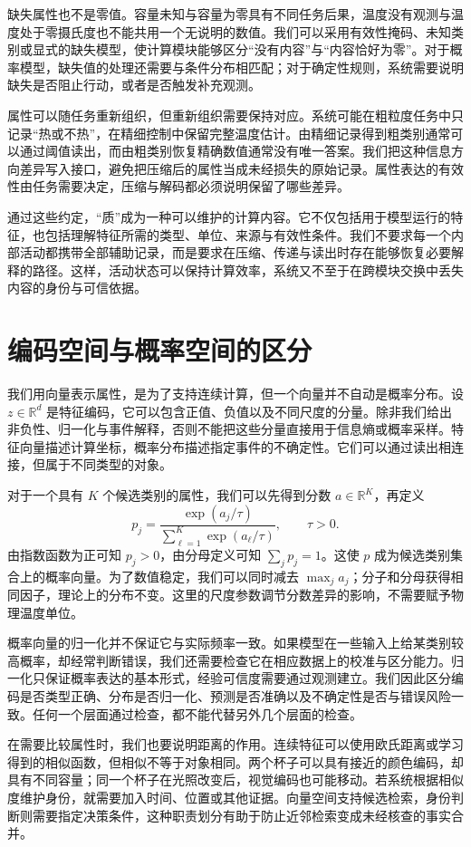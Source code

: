缺失属性也不是零值。容量未知与容量为零具有不同任务后果，温度没有观测与温度处于零摄氏度也不能共用一个无说明的数值。我们可以采用有效性掩码、未知类别或显式的缺失模型，使计算模块能够区分“没有内容”与“内容恰好为零”。对于概率模型，缺失值的处理还需要与条件分布相匹配；对于确定性规则，系统需要说明缺失是否阻止行动，或者是否触发补充观测。

属性可以随任务重新组织，但重新组织需要保持对应。系统可能在粗粒度任务中只记录“热或不热”，在精细控制中保留完整温度估计。由精细记录得到粗类别通常可以通过阈值读出，而由粗类别恢复精确数值通常没有唯一答案。我们把这种信息方向差异写入接口，避免把压缩后的属性当成未经损失的原始记录。属性表达的有效性由任务需要决定，压缩与解码都必须说明保留了哪些差异。

通过这些约定，“质”成为一种可以维护的计算内容。它不仅包括用于模型运行的特征，也包括理解特征所需的类型、单位、来源与有效性条件。我们不要求每一个内部活动都携带全部辅助记录，而是要求在压缩、传递与读出时存在能够恢复必要解释的路径。这样，活动状态可以保持计算效率，系统又不至于在跨模块交换中丢失内容的身份与可信依据。

\section{编码空间与概率空间的区分}
\label{sec:qualia_elements}

我们用向量表示属性，是为了支持连续计算，但一个向量并不自动是概率分布。设 $z\in\mathbb{R}^d$ 是特征编码，它可以包含正值、负值以及不同尺度的分量。除非我们给出非负性、归一化与事件解释，否则不能把这些分量直接用于信息熵或概率采样。特征向量描述计算坐标，概率分布描述指定事件的不确定性。它们可以通过读出相连接，但属于不同类型的对象。

对于一个具有 $K$ 个候选类别的属性，我们可以先得到分数 $a\in\mathbb{R}^K$，再定义
\[
p_j=\frac{\exp(a_j/\tau)}{\sum_{\ell=1}^K\exp(a_\ell/\tau)},\qquad \tau>0.
\]
由指数函数为正可知 $p_j>0$，由分母定义可知 $\sum_jp_j=1$。这使 $p$ 成为候选类别集合上的概率向量。为了数值稳定，我们可以同时减去 $\max_ja_j$；分子和分母获得相同因子，理论上的分布不变。这里的尺度参数调节分数差异的影响，不需要赋予物理温度单位。

概率向量的归一化并不保证它与实际频率一致。如果模型在一些输入上给某类别较高概率，却经常判断错误，我们还需要检查它在相应数据上的校准与区分能力。归一化只保证概率表达的基本形式，经验可信度需要通过观测建立。我们因此区分编码是否类型正确、分布是否归一化、预测是否准确以及不确定性是否与错误风险一致。任何一个层面通过检查，都不能代替另外几个层面的检查。

在需要比较属性时，我们也要说明距离的作用。连续特征可以使用欧氏距离或学习得到的相似函数，但相似不等于对象相同。两个杯子可以具有接近的颜色编码，却具有不同容量；同一个杯子在光照改变后，视觉编码也可能移动。若系统根据相似度维护身份，就需要加入时间、位置或其他证据。向量空间支持候选检索，身份判断则需要指定决策条件，这种职责划分有助于防止近邻检索变成未经核查的事实合并。


